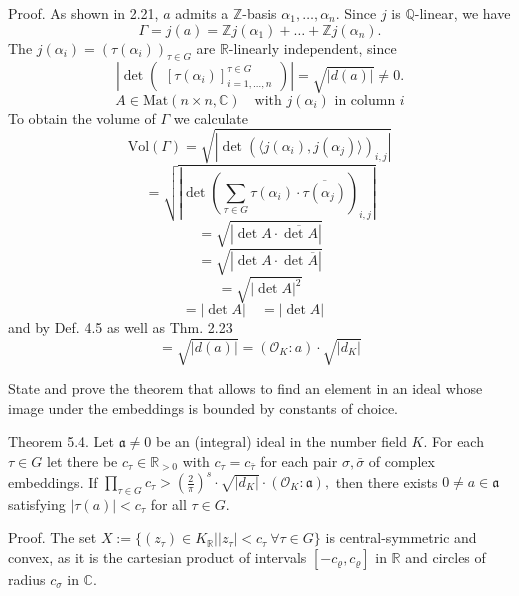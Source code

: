 Proof. 
As shown in 2.21, \( a \) admits a \(\mathbb{Z}\)-basis \( \alpha_1, \ldots, \alpha_n \). Since \( j \) is \(\mathbb{Q}\)-linear, we have
\[
\Gamma = j(a) = \mathbb{Z}j(\alpha_1) + \ldots + \mathbb{Z}j(\alpha_n).
\]
The \( j(\alpha_i) = (\tau(\alpha_i))_{\tau \in G} \) are \(\mathbb{R}\)-linearly independent, since
\[
\left| \det \begin{pmatrix} \left[ \tau(\alpha_i) \right]_{i=1,\ldots,n}^{\tau \in G} \end{pmatrix} \right| = \sqrt{|d(a)|} \neq 0.
\]
\[
A \in \text{Mat}(n \times n, \mathbb{C}) \quad \text{with } j(\alpha_i) \text{ in column } i
\]
To obtain the volume of \( \Gamma \) we calculate
\[
\text{Vol}(\Gamma) = \sqrt{\left| \det \left( \langle j(\alpha_i), j(\alpha_j) \rangle \right)_{i,j} \right|}
\]
\[
= \sqrt{\left| \det \left( \sum_{\tau \in G} \tau(\alpha_i) \cdot \overline{\tau(\alpha_j)} \right)_{i,j} \right|}
\]
\[
= \sqrt{\left| \det A \cdot \overline{\det A} \right|}
\]
\[
= \sqrt{\left| \det A \cdot \det \overline{A} \right|}
\]
\[
= \sqrt{\left| \det A \right|^2}
\]
\[
= |\det A| \quad = \left| \det A \right| \quad \text{}
\]
and by Def. 4.5 as well as Thm. 2.23
\[
= \sqrt{|d(a)|} = (\mathcal{O}_K : a) \cdot \sqrt{|d_K|}
\]



State and prove the theorem that allows to find an element in an ideal 
whose image under the embeddings is bounded by constants of choice.

Theorem 5.4. 
Let \(\mathfrak{a} \neq 0\) be an (integral) ideal in the number field \(K\). 
For each \(\tau \in G\) let there be \(c_\tau \in \mathbb{R}_{>0}\) with \(c_\tau = c_{\bar{\tau}}\) for each pair \(\sigma, \bar{\sigma}\) 
of complex embeddings. 
If
\(
\prod_{\tau \in G} c_\tau > \left(\frac{2}{\pi}\right)^s \cdot \sqrt{\vert d_K \vert} \cdot (\mathcal{O}_K : \mathfrak{a}),
\)
then there exists \(0 \neq a \in \mathfrak{a}\) satisfying \(\vert \tau(a) \vert < c_\tau\) for all \(\tau \in G\).

Proof. 
The set 
\( X := \{ (z_\tau) \in K_\mathbb{R} \mid \vert z_\tau \vert < c_\tau \ \forall \tau \in G \} \)
is central-symmetric and convex, as it is the cartesian product of intervals \([-c_\varrho, c_\varrho]\) in \(\mathbb{R}\) and 
circles of radius \(c_\sigma\) in \(\mathbb{C}\).

